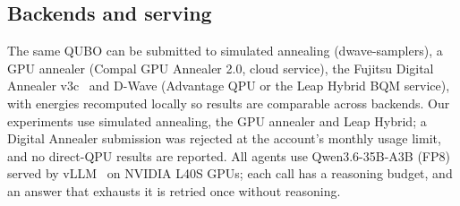 

\subsection{Backends and serving}
The same QUBO can be submitted to simulated annealing (dwave-samplers), a GPU annealer (Compal GPU Annealer 2.0,
cloud service), the Fujitsu Digital Annealer v3c~\citep{aramon2019digital} and D-Wave (Advantage QPU or the Leap
Hybrid BQM service), with energies recomputed locally so results are comparable across backends. Our experiments
use simulated annealing, the GPU annealer and Leap Hybrid; a Digital Annealer submission was rejected at the
account's monthly usage limit, and no direct-QPU results are reported. All agents use Qwen3.6-35B-A3B (FP8)~\citep{qwen3report2025}
served by vLLM~\citep{kwon2023vllm} on NVIDIA L40S GPUs; each call has a reasoning budget, and an answer that
exhausts it is retried once without reasoning.
